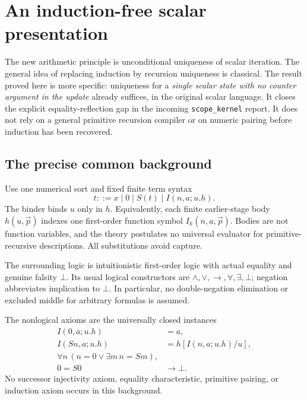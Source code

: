 
\section{An induction-free scalar presentation}
\label{sec:ur-main}

The new arithmetic principle is unconditional uniqueness of scalar
iteration.  The general idea of replacing induction by recursion
uniqueness is classical.  The result proved here is more specific:
uniqueness for a \emph{single scalar state with no counter argument in
the update} already suffices, in the original scalar language.  It
closes the explicit equality-reflection gap in the incoming
\texttt{scope\_kernel} report.  It does not rely on a general primitive
recursion compiler or on numeric pairing before induction has been
recovered.

\subsection{The precise common background}
Use one numerical sort and fixed finite term syntax
\[
 t ::= x\mid0\mid S(t)\mid I(n,a;u.h).
\]
The binder binds $u$ only in $h$.  Equivalently, each finite earlier-stage
body $h(u,\vec p)$ indexes one first-order function symbol
$I_h(n,a,\vec p)$.  Bodies are not function variables, and the theory
postulates no universal evaluator for primitive-recursive descriptions.
All substitutions avoid capture.

The surrounding logic is intuitionistic first-order logic with actual
equality and genuine falsity $\bot$.  Its usual logical constructors are
$\land,\lor,\to,\forall,\exists,\bot$; negation abbreviates implication
to $\bot$.  In particular, no double-negation elimination or excluded
middle for arbitrary formulas is assumed.

The nonlogical axioms are the universally closed instances
\begin{align*}
 I(0,a;u.h)&=a,\\
 I(Sn,a;u.h)&=h[I(n,a;u.h)/u],\\
 \forall n\,(n=0\lor\exists m\,n=Sm),&\\
 0=S0&\longrightarrow\bot.
\end{align*}
No successor injectivity axiom, equality characteristic, primitive
pairing, or induction axiom occurs in this background.

